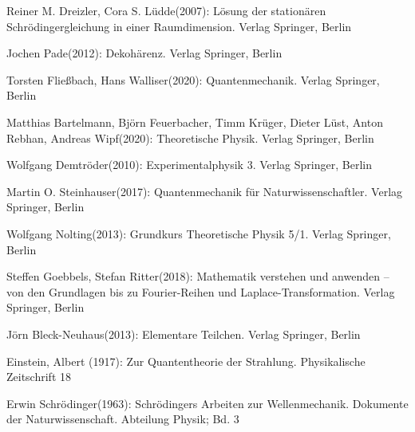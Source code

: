 \documentclass[12pt,oneside, a4paper]{scrbook}
\begin{document}
\begin{thebibliography}{1}

\bibitem{} 
Reiner M. Dreizler, Cora S. Lüdde(2007): Lösung der stationären Schrödingergleichung in einer Raumdimension. Verlag Springer, Berlin

\bibitem{}
Jochen Pade(2012): Dekohärenz. Verlag Springer, Berlin

\bibitem{}
Torsten Fließbach, Hans Walliser(2020): Quantenmechanik. Verlag Springer, Berlin

\bibitem{}
Matthias Bartelmann, Björn Feuerbacher, Timm Krüger, Dieter Lüst, Anton Rebhan, Andreas Wipf(2020): Theoretische Physik. Verlag Springer, Berlin

\bibitem{}
Wolfgang Demtröder(2010): Experimentalphysik 3. Verlag Springer, Berlin

\bibitem{}
Martin O. Steinhauser(2017): Quantenmechanik für Naturwissenschaftler. Verlag Springer, Berlin

\bibitem{}
Wolfgang Nolting(2013): Grundkurs Theoretische Physik 5/1. Verlag Springer, Berlin

\bibitem{}
Steffen Goebbels, Stefan Ritter(2018): Mathematik verstehen und anwenden – von den Grundlagen bis zu Fourier-Reihen und Laplace-Transformation. Verlag Springer, Berlin

\bibitem{}
Jörn Bleck-Neuhaus(2013): Elementare Teilchen. Verlag Springer, Berlin

\bibitem{}
Einstein, Albert (1917): Zur Quantentheorie der Strahlung. Physikalische Zeitschrift 18

\bibitem{}
Erwin Schrödinger(1963): Schrödingers Arbeiten zur Wellenmechanik. Dokumente der Naturwissenschaft. Abteilung Physik; Bd. 3


\end{thebibliography}
\end{document}
